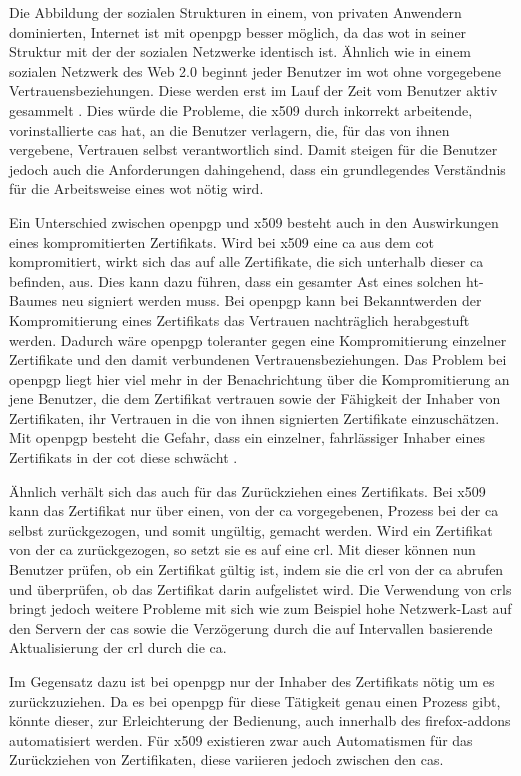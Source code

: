 Die Abbildung der sozialen Strukturen in einem, von privaten Anwendern dominierten, Internet ist mit \gls{openpgp} besser möglich, da das \gls{wot} in
seiner Struktur mit der der sozialen Netzwerke identisch ist. Ähnlich wie in einem sozialen Netzwerk des Web 2.0 beginnt jeder Benutzer im \gls{wot} ohne
vorgegebene Vertrauensbeziehungen. Diese werden erst im Lauf der Zeit vom Benutzer aktiv gesammelt \cite{pki:perlman}. Dies würde die Probleme, die \gls{x509}
durch inkorrekt arbeitende, vorinstallierte \glspl{ca} hat, an die Benutzer verlagern, die, für das von ihnen vergebene, Vertrauen selbst verantwortlich sind.
Damit steigen für die Benutzer jedoch auch die Anforderungen dahingehend, dass ein grundlegendes Verständnis für die Arbeitsweise eines \gls{wot} nötig wird.

Ein Unterschied zwischen \gls{openpgp} und \gls{x509} besteht auch in den Auswirkungen eines kompromitierten Zertifikats. Wird bei \gls{x509} eine \gls{ca} aus
dem \gls{cot} kompromitiert, wirkt sich das auf alle Zertifikate, die sich unterhalb dieser \gls{ca} befinden, aus. Dies kann dazu führen, dass ein gesamter Ast
eines solchen \gls{ht}-Baumes neu signiert werden muss. Bei \gls{openpgp} kann bei Bekanntwerden der Kompromitierung eines Zertifikats das Vertrauen nachträglich
herabgestuft werden\cite{pgp}. Dadurch wäre \gls{openpgp} toleranter gegen eine Kompromitierung einzelner Zertifikate und den damit verbundenen
Vertrauensbeziehungen. Das Problem bei \gls{openpgp} liegt hier viel mehr in der Benachrichtung über die Kompromitierung an jene Benutzer, die dem Zertifikat
vertrauen sowie der Fähigkeit der Inhaber von Zertifikaten, ihr Vertrauen  in die von ihnen signierten Zertifikate einzuschätzen. Mit \gls{openpgp} besteht die
Gefahr, dass ein einzelner, fahrlässiger Inhaber eines Zertifikats in der \gls{cot} diese schwächt \cite{pki:perlman}.

Ähnlich verhält sich das auch für das Zurückziehen eines Zertifikats. Bei \gls{x509} kann das Zertifikat nur über einen, von der \gls{ca} vorgegebenen, Prozess
bei der \gls{ca} selbst zurückgezogen, und somit ungültig, gemacht werden. Wird ein Zertifikat von der \gls{ca} zurückgezogen, so setzt sie es auf eine
\gls{crl}. Mit dieser können nun Benutzer prüfen, ob ein Zertifikat gültig ist, indem sie die \gls{crl} von der \gls{ca} abrufen und überprüfen, ob das
Zertifikat darin aufgelistet wird. Die Verwendung von \glspl{crl} bringt jedoch weitere Probleme mit sich wie zum Beispiel hohe Netzwerk-Last auf den Servern
der \glspl{ca} sowie die Verzögerung durch die auf Intervallen basierende Aktualisierung der \gls{crl} durch die \gls{ca}\cite{10.1109/MC.2002.1023787}. 

Im Gegensatz dazu ist bei \gls{openpgp} nur der Inhaber des Zertifikats nötig um es
zurückzuziehen. Da es bei \gls{openpgp} für diese Tätigkeit genau einen Prozess gibt, könnte dieser, zur Erleichterung der Bedienung, auch innerhalb des
\glspl{firefox-addon} automatisiert werden. Für \gls{x509} existieren zwar auch Automatismen für das Zurückziehen von Zertifikaten, diese variieren jedoch
zwischen den \glspl{ca}.
